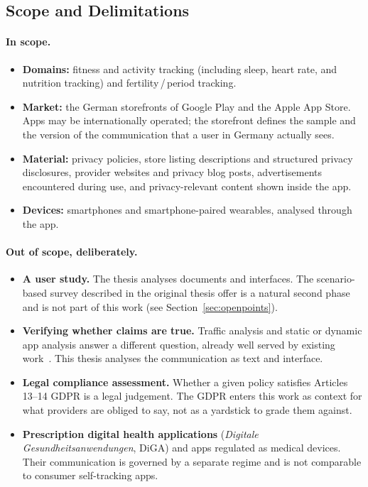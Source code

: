 \subsection{Scope and Delimitations}

\paragraph{In scope.}
\begin{itemize}[leftmargin=*,itemsep=2pt]
  \item \textbf{Domains:} fitness and activity tracking (including sleep, heart
        rate, and nutrition tracking) and fertility\,/\,period tracking.
  \item \textbf{Market:} the German storefronts of Google Play and the Apple App
        Store. Apps may be internationally operated; the storefront defines the
        sample and the version of the communication that a user in Germany
        actually sees.
  \item \textbf{Material:} privacy policies, store listing descriptions and
        structured privacy disclosures, provider websites and privacy blog
        posts, advertisements encountered during use, and privacy-relevant
        content shown inside the app.
  \item \textbf{Devices:} smartphones and smartphone-paired wearables, analysed
        through the app.
\end{itemize}

\paragraph{Out of scope, deliberately.}
\begin{itemize}[leftmargin=*,itemsep=2pt]
  \item \textbf{A user study.} The thesis analyses documents and interfaces. The
        scenario-based survey described in the original thesis offer is a natural
        second phase and is not part of this work (see
        Section~\ref{sec:openpoints}).
  \item \textbf{Verifying whether claims are true.} Traffic analysis and static
        or dynamic app analysis answer a different question, already well served
        by existing
        work~\parencite{huckvale2019assessment,hudig2025intimate,arkalakis2024abandon}.
        This thesis analyses the communication as text and interface.
  \item \textbf{Legal compliance assessment.} Whether a given policy satisfies
        Articles 13--14 GDPR is a legal judgement. The GDPR enters this work as
        context for what providers are obliged to say, not as a yardstick to
        grade them against.
  \item \textbf{Prescription digital health applications} (\emph{Digitale
        Gesundheitsanwendungen}, DiGA) and apps regulated as medical devices.
        Their communication is governed by a separate regime and is not
        comparable to consumer self-tracking apps.
\end{itemize}
